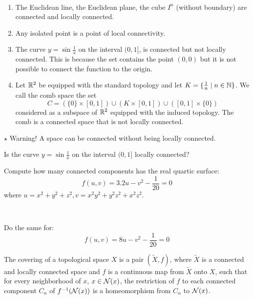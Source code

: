 \begin{examples}
~\begin{enumerate}
\item The Euclidean line, the Euclidean plane, the cube $I^{n}$ (without boundary) are connected and locally connected.
\item Any isolated point is a point of local connectivity.
\item The curve $y=\sin\frac{1}{x}$ on the interval $(0,1]$, is connected but not locally connected. This is because the set contains the point $(0,0)$ but it is not possible to connect the function to the origin.
\item Let $\mathbb{R}^{2}$ be equipped with the standard topology and let $K=\{\frac{1}{n} \mid n\in \mathbb{N}\}$. We call the comb space the set
\[C= (\{0\}\times[0,1])\cup (K\times[0,1])\cup ([0,1]\times\{0\})\]
considered as a subspace of $\mathbb{R}^{2}$ equipped with the induced topology. The comb is a connected space that is not locally connected.

\end{enumerate}

\end{examples}

\noindent $\star$ Warning! A space can be connected without being locally connected.

\begin{ex}\label{Ex:8}
 Is the curve $y=\sin\frac{1}{x}$ on the interval $(0,1]$ locally connected?
\end{ex}



\begin{ex}\label{Ex:9}
    Compute how many connected components has the real quartic surface: 
    \[f(u,v)=3.2u-v^2-\frac{1}{20}=0\]
     where $u=x^2+y^2+z^2,v=x^2y^2+y^2z^2+x^2z^2$.

\, 

Do the same for: 
\[f(u,v)=8u-v^2-\frac{1}{20}=0\]
\end{ex}


\begin{definition}
The covering of a topological space $X$ is a pair $(\tilde X,f)$, where $\tilde X$ is a connected and locally connected space and $f$ is a continuous map from $\tilde X$ onto $X$, such that for every  neighborhood of $x$, $x\in \mathcal{N}(x)$, the restriction of $f$ to each connected component $C_{\alpha}$ of $f^{-1}(\mathcal{N}(x))$ is a homeomorphism from $C_{\alpha}$ to $\mathcal{N}(x)$.
\end{definition}

